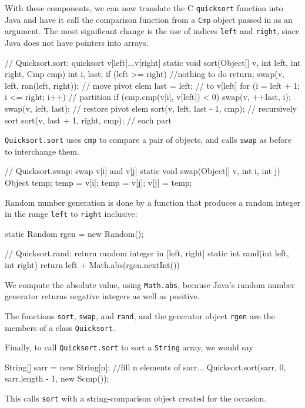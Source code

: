 With these components, we can now translate the C \verb'quicksort' function
into Java and have it call the comparison function from a \verb'Cmp' object
passed in as an argument. The most significant change is the use of indices
\verb'left' and \verb'right', since Java does not have pointers into
arrays.
\begin{wellcode}
    // Quicksort.sort: quicksort v[left]...v[right]
    static void sort(Object[] v, int left, int right, Cmp cmp)
    {
        int i, last;
        if (left >= right)  //nothing to do
            return;
        swap(v, left, ran(left, right));    // move pivot elem
        last = left;                        //      to v[left]
        for (i = left + 1; i <= right; i++) // partition
            if (cmp.cmp(v[i], v[left]) < 0)
                swap(v, ++last, i);
        swap(v, left, last);                // restore pivot elem
        sort(v, left, last - 1, cmp);       // recursively sort
        sort(v, last + 1, right, cmp);      //      each part
    }
\end{wellcode}
\verb'Quicksort.sort' uses \verb'cmp' to compare a pair of objects, and
calls \verb'swap' as before to interchange them.
\begin{wellcode}
    // Quicksort.swap: swap v[i] and v[j]
    static void swap(Object[] v, int i, int j)
    {
        Object temp;
        temp = v[i];
        temp = v[j];
        v[j] = temp;
    }
\end{wellcode}
Random number generation is done by a function that produces a random
integer in the range \verb'left' to \verb'right' inclusive:
\begin{wellcode}
    static Random rgen = new Random();

    // Quicksort.rand: return random integer in [left, right]
    static int rand(int left, int right)
    {
        return left + Math.abs(rgen.nextInt()) %
    }
\end{wellcode}
We compute the absolute value, using \verb'Math.abs', because Java's random
number generator returns negative integers as well as positive.

The functions \verb'sort', \verb'swap', and \verb'rand', and the generator
object \verb'rgen' are the members of a class \verb'Quicksort'.

Finally, to call \verb'Quicksort.sort' to sort a \verb'String' array, we
would say
\begin{wellcode}
    String[] sarr = new String[n];
    //fill n elements of sarr...
    Quicksort.sort(sarr, 0, sarr.length - 1, new Scmp());
\end{wellcode}
This calls \verb'sort' with a string-comparison object created for the
occasion.


